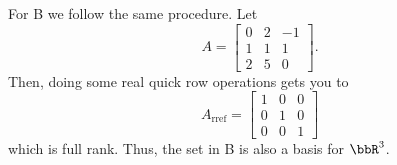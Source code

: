 \begin{questions}
\begin{solution}
    For B we follow the same procedure. Let
    \[
      A=\begin{bmatrix}%
        0&2&-1\\
        1&1&1\\
        2&5&0
      \end{bmatrix}.
    \]
    Then, doing some real quick row operations gets you to
    \[
      A_{\text{rref}}=%
      \begin{bmatrix}%
        1&0&0\\
        0&1&0\\
        0&0&1
      \end{bmatrix}
    \]
    which is full rank. Thus, the set in B is also a basis for $\bbR^3$.
  \end{solution}
\end{questions}

